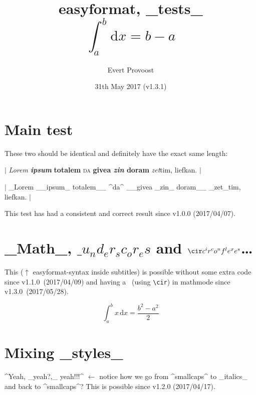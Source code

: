 \documentclass[11pt]{article}
\title{\vspace{-4em}\textsf{easyformat}, _tests_\\$$ \int_a^b \mathrm{d}x = b - a $$}
\author{Evert Provoost}
\date{31th May 2017 (v1.3.1)}
\begin{document}
	\enableeasyformat %

	\maketitle
	\tableofcontents
	\vspace{2em}

	\section{Main test}
	These two should be identical and definitely have the exact same length:

	$|$ \textit{Lorem \textbf{ipsum}}\textbf{ totalem} \textsc{da} \textbf{givea \textit{zin} doram} \textit{zet}tim, liefkan. $|$

	$|$ _Lorem __ipsum_ totalem__ ^da^ __givea _zin_ doram__ _zet_tim, liefkan. $|$
	
	\noindent This test has had a consistent and correct result since v1.0.0 (2017/04/07).

	\section{_Math_, $\_ u_nd_er_sc_or_es$ and $\cir c^ir^co^nf^le^xe^s$\dots}
	This ($\uparrow$ \textsf{easyformat}-syntax inside subtitles) is possible without some extra code since v1.1.0~(2017/04/09) and having a \cir\ (using \verb|\cir|) in mathmode since v1.3.0~(2017/05/28).
	
	$$ \int_a^b x\,\mathrm{d}x = \frac{b^2 - a^2}{2} $$
	
	\section{Mixing _styles_}
	^Yeah, _yeah?,_ yeah!!!^
	$\leftarrow$ notice how we go from ^smallcaps^ to _italics_ and back to ^smallcaps^? This is possible since v1.2.0 (2017/04/17).
\end{document}
